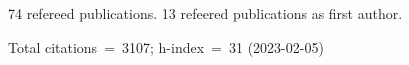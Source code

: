 74 refereed publications. 13 refeered publications as first author.

Total citations~=~3107; h-index~=~31 (2023-02-05)